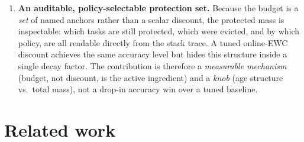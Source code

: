 \documentclass[review,12pt,number]{elsarticle}
\begin{document}
\begin{enumerate}
learning term and the protected-mass horizon: bounding accumulated
anchor mass is the active ingredient.
\item \textbf{An auditable, policy-selectable protection set.} Because
the budget is a \emph{set} of named anchors rather than a scalar
discount, the protected mass is inspectable: which tasks are still
protected, which were evicted, and by which policy, are all readable
directly from the stack trace. A tuned online-EWC discount achieves the
same accuracy level but hides this structure inside a single decay
factor. The contribution is therefore a \emph{measurable mechanism}
(budget, not discount, is the active ingredient) and a \emph{knob}
(age structure vs.\ total mass), not a drop-in accuracy win over a
tuned baseline.
\end{enumerate}

\section{Related work}
\label{sec:related}
\end{document}
